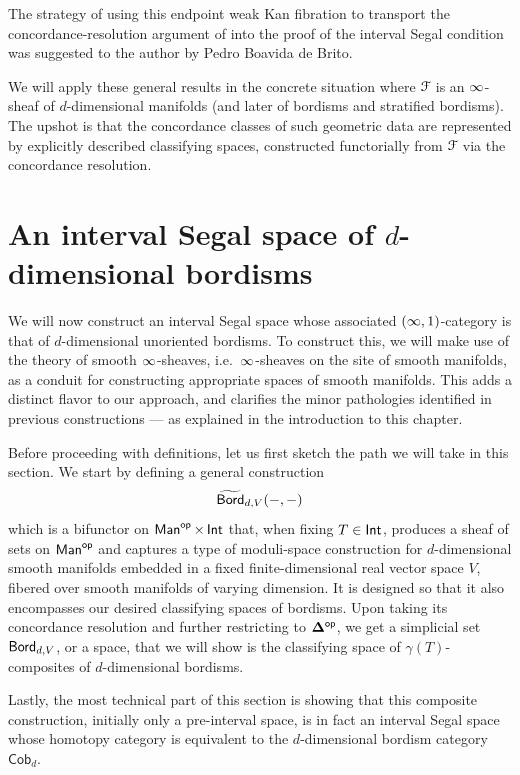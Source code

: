 The strategy of using this endpoint weak Kan fibration to transport the concordance-resolution argument of \cite[Theorem~5.1]{BBEP24} into the proof of the interval Segal condition was suggested to the author by Pedro Boavida de Brito.

\medskip

We will apply these general results in the concrete situation where $\mathcal F$ is an $\operatorname{\infty}$-sheaf of $d$-dimensional manifolds (and later of bordisms and stratified bordisms). The upshot is that the concordance classes of such geometric data are represented by explicitly described classifying spaces, constructed functorially from $\mathcal F$ via the concordance resolution.

\section{An interval Segal space of \texorpdfstring{$d$}{d}-dimensional bordisms}

We will now construct an interval Segal space whose associated $(\operatorname{\infty},1)$-category is that of $d$-dimensional unoriented bordisms. To construct this, we will make use of the theory of smooth $\operatorname{\infty}$-sheaves, i.e.\ $\operatorname{\infty}$-sheaves on the site of smooth manifolds, as a conduit for constructing appropriate spaces of smooth manifolds. This adds a distinct flavor to our approach, and clarifies the minor pathologies identified in previous constructions --- as explained in the introduction to this chapter. 

Before proceeding with definitions, let us first sketch the path we will take in this section. We start by defining a general construction
\[
\widetilde{\operatorname{\mathsf{Bord}}}_{d,V}(-,-)
\]
which is a bifunctor on $\operatorname{\sf Man}^{\mathsf{op}}\times \operatorname{\mathsf{Int}}$ that, when fixing $T\in \operatorname{\mathsf{Int}}$, produces a sheaf of sets on $\operatorname{\sf Man}^{\mathsf{op}}$ and captures a type of moduli-space construction for $d$-dimensional smooth manifolds embedded in a fixed finite-dimensional real vector space $V$, fibered over smooth manifolds of varying dimension. It is designed so that it also encompasses our desired classifying spaces of bordisms. Upon taking its concordance resolution and further restricting to $\mathbf\Delta^{\mathsf{op}}$, we get a simplicial set $\operatorname{\mathsf{Bord}}_{d,V}$, or a space, that we will show is the classifying space of $\gamma(T)$-composites of $d$-dimensional bordisms.

Lastly, the most technical part of this section is showing that this composite
construction, initially only a pre-interval space, is in fact an interval Segal
space whose homotopy category is equivalent to the $d$-dimensional bordism
category $\mathsf{Cob}_d$.

